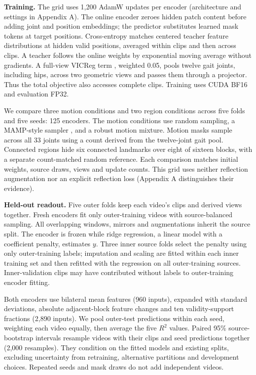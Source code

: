 \documentclass{article}
\begin{document}
\textbf{Training.} The grid uses 1,200 AdamW updates per encoder
(architecture and settings in Appendix A). The online encoder zeroes
hidden patch content before adding joint and position embeddings; the
predictor substitutes learned mask tokens at target positions.
Cross-entropy matches centered teacher feature distributions at hidden
valid positions, averaged within clips and then across clips. A teacher
follows the online weights by exponential moving average without
gradients. A full-view VICReg term \citep{vicreg}, weighted 0.05, pools
twelve gait joints, including hips, across two geometric views and
passes them through a projector. Thus the total objective also accesses
complete clips. Training uses CUDA BF16 and evaluation FP32.

We compare three motion conditions and two region conditions across five
folds and five seeds: 125 encoders. The motion conditions use random
sampling, a MAMP-style sampler \citep{mamp}, and a robust motion
mixture. Motion masks sample across all 33 joints using a count derived
from the twelve-joint gait pool. Connected regions hide six connected
landmarks over eight of sixteen blocks, with a separate count-matched
random reference. Each comparison matches initial weights, source draws,
views and update counts. This grid uses neither reflection augmentation
nor an explicit reflection loss (Appendix A distinguishes their
evidence).

\textbf{Held-out readout.} Five outer folds keep each video's clips and
derived views together. Fresh encoders fit only outer-training videos
with source-balanced sampling. All overlapping windows, mirrors and
augmentations inherit the source split. The encoder is frozen while
ridge regression, a linear model with a coefficient penalty, estimates
\(y\). Three inner source folds select the penalty using only
outer-training labels; imputation and scaling are fitted within each
inner training set and then refitted with the regression on all
outer-training sources. Inner-validation clips may have contributed
without labels to outer-training encoder fitting.

Both encoders use bilateral mean features (960 inputs), expanded with
standard deviations, absolute adjacent-block feature changes and ten
validity-support fractions (2,890 inputs). We pool outer-test
predictions within each seed, weighting each video equally, then average
the five \(R^2\) values. Paired 95\% source-bootstrap intervals resample
videos with their clips and seed predictions together (2,000 resamples).
They condition on the fitted models and existing splits, excluding
uncertainty from retraining, alternative partitions and development
choices. Repeated seeds and mask draws do not add independent videos.
\end{document}
